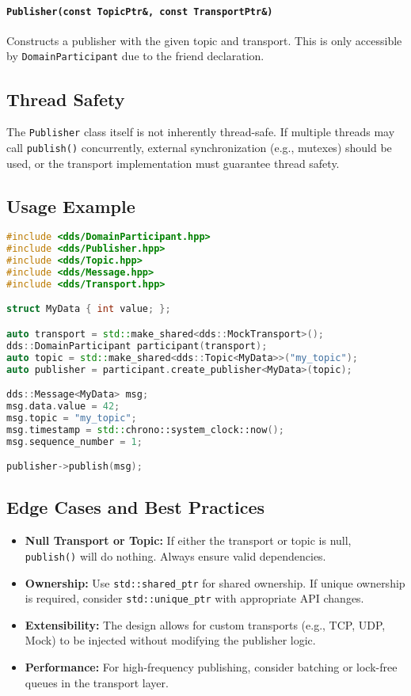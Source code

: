 \documentclass[12pt]{report}
\begin{document}
\paragraph{\texttt{Publisher(const TopicPtr\&, const TransportPtr\&)}}
Constructs a publisher with the given topic and transport. This is only accessible by \texttt{DomainParticipant} due to the friend declaration.

\subsection{Thread Safety}
The \texttt{Publisher} class itself is not inherently thread-safe. If multiple threads may call \texttt{publish()} concurrently, external synchronization (e.g., mutexes) should be used, or the transport implementation must guarantee thread safety.

\subsection{Usage Example}
\begin{lstlisting}[language=C++]
#include <dds/DomainParticipant.hpp>
#include <dds/Publisher.hpp>
#include <dds/Topic.hpp>
#include <dds/Message.hpp>
#include <dds/Transport.hpp>

struct MyData { int value; };

auto transport = std::make_shared<dds::MockTransport>();
dds::DomainParticipant participant(transport);
auto topic = std::make_shared<dds::Topic<MyData>>("my_topic");
auto publisher = participant.create_publisher<MyData>(topic);

dds::Message<MyData> msg;
msg.data.value = 42;
msg.topic = "my_topic";
msg.timestamp = std::chrono::system_clock::now();
msg.sequence_number = 1;

publisher->publish(msg);
\end{lstlisting}

\subsection{Edge Cases and Best Practices}
\begin{itemize}
    \item \textbf{Null Transport or Topic:} If either the transport or topic is null, \texttt{publish()} will do nothing. Always ensure valid dependencies.
    \item \textbf{Ownership:} Use \texttt{std::shared\_ptr} for shared ownership. If unique ownership is required, consider \texttt{std::unique\_ptr} with appropriate API changes.
    \item \textbf{Extensibility:} The design allows for custom transports (e.g., TCP, UDP, Mock) to be injected without modifying the publisher logic.
    \item \textbf{Performance:} For high-frequency publishing, consider batching or lock-free queues in the transport layer.
\end{itemize}
\end{document}
